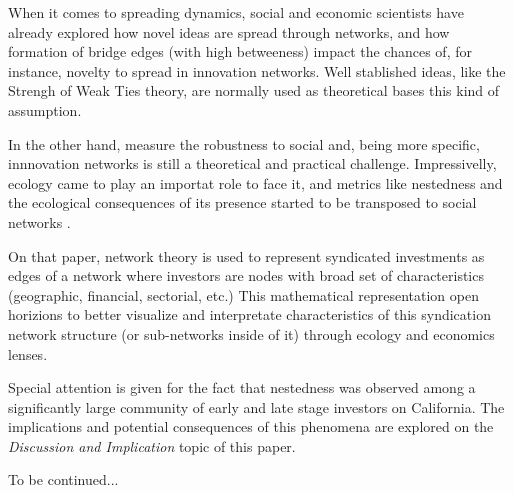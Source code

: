 When it comes to spreading dynamics, social and economic scientists have already explored how novel ideas are spread through networks, and how formation of bridge edges (with high betweeness) impact the chances of, for instance, novelty to spread in innovation networks. Well stablished ideas, like the Strengh of Weak Ties theory, are normally used as theoretical bases this kind of assumption.

In the other hand, measure the robustness to social and, being more specific, innnovation networks is still a theoretical and practical challenge. Impressivelly, ecology came to play an importat role to face it, and metrics like nestedness and the ecological consequences of its presence started to be transposed to social networks \cite{Theophile2024}.

On that paper, network theory is used to represent syndicated investments as edges of a network where investors are nodes with broad set of characteristics (geographic, financial, sectorial, etc.) This mathematical representation open horizions to better visualize and interpretate characteristics of this syndication network structure (or sub-networks inside of it) through ecology and economics lenses. 

Special attention is given for the fact that nestedness was observed among a significantly large community of early and late stage investors on California. The implications and potential consequences of this phenomena are explored on the \textit{Discussion and Implication} topic of this paper.

To be continued...